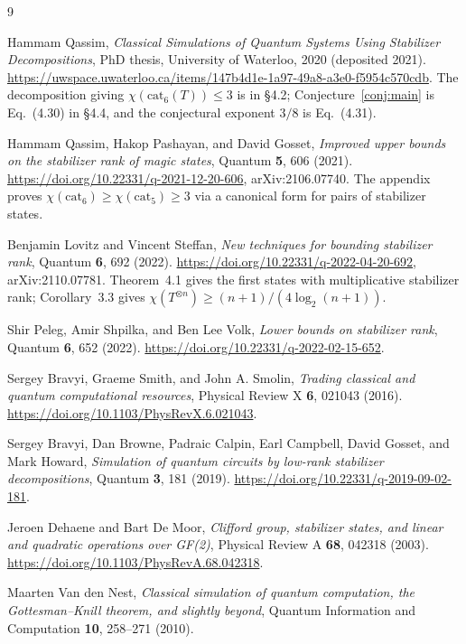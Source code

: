 \documentclass[11pt]{article}
\theoremstyle{plain}
\theoremstyle{definition}
\newcommand{\cat}{\mathrm{cat}}
\begin{document}
\begin{thebibliography}{9}

Hammam Qassim,
\emph{Classical Simulations of Quantum Systems Using Stabilizer Decompositions},
PhD thesis, University of Waterloo, 2020 (deposited 2021).
\url{https://uwspace.uwaterloo.ca/items/147b4d1e-1a97-49a8-a3e0-f5954c570cdb}.
The decomposition giving $\chi(\cat_6(T))\le3$ is in \S4.2; Conjecture~\ref{conj:main}
is Eq.~(4.30) in \S4.4, and the conjectural exponent $3/8$ is Eq.~(4.31).

Hammam Qassim, Hakop Pashayan, and David Gosset,
\emph{Improved upper bounds on the stabilizer rank of magic states},
Quantum \textbf{5}, 606 (2021).
\url{https://doi.org/10.22331/q-2021-12-20-606}, arXiv:2106.07740.
The appendix proves $\chi(\cat_6)\ge\chi(\cat_5)\ge3$ via a canonical form for pairs of
stabilizer states.

Benjamin Lovitz and Vincent Steffan,
\emph{New techniques for bounding stabilizer rank},
Quantum \textbf{6}, 692 (2022).
\url{https://doi.org/10.22331/q-2022-04-20-692}, arXiv:2110.07781.
Theorem~4.1 gives the first states with multiplicative stabilizer rank; Corollary~3.3
gives $\chi(T^{\otimes n})\ge(n+1)/(4\log_2(n+1))$.

Shir Peleg, Amir Shpilka, and Ben Lee Volk,
\emph{Lower bounds on stabilizer rank},
Quantum \textbf{6}, 652 (2022).
\url{https://doi.org/10.22331/q-2022-02-15-652}.

Sergey Bravyi, Graeme Smith, and John A. Smolin,
\emph{Trading classical and quantum computational resources},
Physical Review X \textbf{6}, 021043 (2016).
\url{https://doi.org/10.1103/PhysRevX.6.021043}.

Sergey Bravyi, Dan Browne, Padraic Calpin, Earl Campbell, David Gosset, and Mark Howard,
\emph{Simulation of quantum circuits by low-rank stabilizer decompositions},
Quantum \textbf{3}, 181 (2019).
\url{https://doi.org/10.22331/q-2019-09-02-181}.

Jeroen Dehaene and Bart De Moor,
\emph{Clifford group, stabilizer states, and linear and quadratic operations over GF(2)},
Physical Review A \textbf{68}, 042318 (2003).
\url{https://doi.org/10.1103/PhysRevA.68.042318}.

Maarten Van den Nest,
\emph{Classical simulation of quantum computation, the Gottesman--Knill theorem, and
slightly beyond},
Quantum Information and Computation \textbf{10}, 258--271 (2010).

\end{thebibliography}
\end{document}
